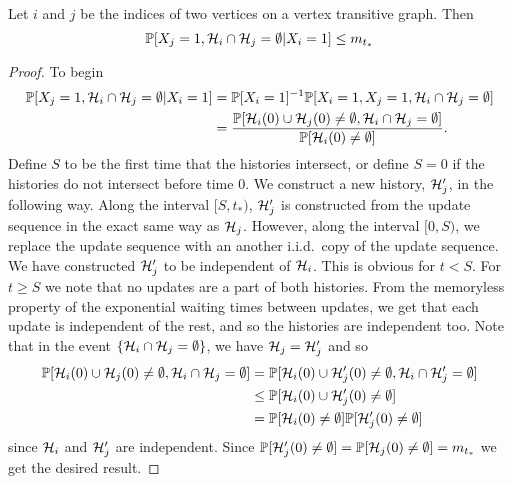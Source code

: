 	\begin{lemma}
		\label{lem: prob X_j and no intersect given X_i = 1}
		Let $i$ and $j$ be the indices of two vertices on a vertex transitive graph. Then
		\begin{equation}
			\mathbb{P}[X_j = 1, \mathcal{H}_i \cap\mathcal{H}_j = \emptyset|X_i = 1] \leq m_{t_*}
		\end{equation}
	\end{lemma}
	\begin{proof}
		To begin
		\begin{align}
			\mathbb{P}[X_j = 1, \mathcal{H}_i \cap\mathcal{H}_j = \emptyset|X_i = 1] &= \mathbb{P}[X_i = 1]^{-1}\mathbb{P}[X_i = 1, X_j = 1, \mathcal{H}_i \cap\mathcal{H}_j = \emptyset]\\
			&= \frac{\mathbb{P}[\mathcal{H}_i(0) \cup \mathcal{H}_j(0) \neq \emptyset, \mathcal{H}_i \cap \mathcal{H}_j = \emptyset]}{\mathbb{P}[\mathcal{H}_i(0) \neq \emptyset]}.
		\end{align}
		Define $S$ to be the first time that the histories intersect, or define $S = 0$ if the histories do not intersect before time $0$. We construct a new history, $\mathcal{H}_j'$, in the following way. Along the interval $[S, t_*)$, $\mathcal{H}_j'$ is constructed from the update sequence in the exact same way as $\mathcal{H}_j$. However, along the interval $[0, S)$, we replace the update sequence with an another i.i.d.\ copy of the update sequence. We have constructed $\mathcal{H}_j'$ to be independent of $\mathcal{H}_i$. This is obvious for $t < S$. For $t \geq S$ we note that no updates are a part of both histories. From the memoryless property of the exponential waiting times between updates, we get that each update is independent of the rest, and so the histories are independent too. Note that in the event $\{\mathcal{H}_i \cap \mathcal{H}_j = \emptyset\}$, we have $\mathcal{H}_j = \mathcal{H}_j'$ and so
		\begin{align}
			\mathbb{P}[\mathcal{H}_i(0) \cup \mathcal{H}_j(0) \neq \emptyset, \mathcal{H}_i \cap \mathcal{H}_j = \emptyset] &= \mathbb{P}[\mathcal{H}_i(0) \cup \mathcal{H}_j'(0) \neq \emptyset, \mathcal{H}_i \cap \mathcal{H}_j' = \emptyset]\\
			&\leq \mathbb{P}[\mathcal{H}_i(0) \cup \mathcal{H}_j'(0) \neq \emptyset]\\
			&= \mathbb{P}[\mathcal{H}_i(0) \neq \emptyset] \mathbb{P}[\mathcal{H}_j'(0) \neq \emptyset]
		\end{align}
		since $\mathcal{H}_i$ and $\mathcal{H}_j'$ are independent. Since $\mathbb{P}[\mathcal{H}_j'(0) \neq \emptyset] = \mathbb{P}[\mathcal{H}_j(0) \neq \emptyset] = m_{t_*}$ we get the desired result.
	\end{proof}

